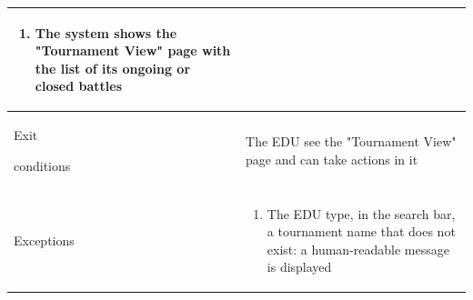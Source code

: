 \begin{center}
\begin{tabular}{| m{2cm} | m{10cm}|}
\begin{enumerate}
                                    \item The system shows the "Tournament View" page with the list of its ongoing or closed battles
                                \end{enumerate}                                                                                                                 \\ \hline
        Exit \par conditions  & The EDU see the "Tournament View" page and can take actions in it                                                               \\ \hline
        Exceptions            & \begin{enumerate}
                                    \item The EDU type, in the search bar, a tournament name that does not exist: a human-readable message is displayed
                                \end{enumerate}                                                                                                                 \\ \hline
    \end{tabular}
\end{center}


